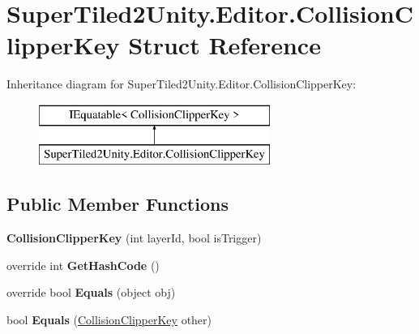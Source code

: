 \hypertarget{struct_super_tiled2_unity_1_1_editor_1_1_collision_clipper_key}{}\section{Super\+Tiled2\+Unity.\+Editor.\+Collision\+Clipper\+Key Struct Reference}
\label{struct_super_tiled2_unity_1_1_editor_1_1_collision_clipper_key}
Inheritance diagram for Super\+Tiled2\+Unity.\+Editor.\+Collision\+Clipper\+Key\+:\begin{figure}[H]
\begin{center}
\leavevmode
\includegraphics[height=2.000000cm]{struct_super_tiled2_unity_1_1_editor_1_1_collision_clipper_key}
\end{center}
\end{figure}
\subsection*{Public Member Functions}
\begin{DoxyCompactItemize}
\item 
\mbox{\label{struct_super_tiled2_unity_1_1_editor_1_1_collision_clipper_key_acb161bed871cab3a79bca1ac6b39d72a}} 
{\bfseries Collision\+Clipper\+Key} (int layer\+Id, bool is\+Trigger)
\item 
\mbox{\label{struct_super_tiled2_unity_1_1_editor_1_1_collision_clipper_key_a09f0c8b4c2dcfcad03148409908b53ad}} 
override int {\bfseries Get\+Hash\+Code} ()
\item 
\mbox{\label{struct_super_tiled2_unity_1_1_editor_1_1_collision_clipper_key_ad25cc7ed62fd64dcb521cf1fa845316a}} 
override bool {\bfseries Equals} (object obj)
\item 
\mbox{\label{struct_super_tiled2_unity_1_1_editor_1_1_collision_clipper_key_a0f2d53763186ed3148f55bf36ff7cfbe}} 
bool {\bfseries Equals} (\mbox{\hyperlink{struct_super_tiled2_unity_1_1_editor_1_1_collision_clipper_key}{Collision\+Clipper\+Key}} other)
\end{DoxyCompactItemize}
